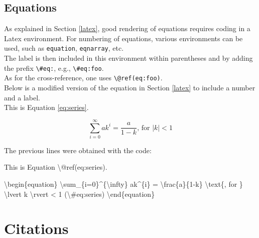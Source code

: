 \documentclass[]{book}
\newenvironment{Shaded}{}{}
\newcommand{\NormalTok}[1]{#1}
\theoremstyle{definition}
\theoremstyle{definition}
\theoremstyle{definition}
\theoremstyle{remark}
\begin{document}
\hypertarget{equations}{%
\subsection{Equations}\label{equations}}

As explained in Section \ref{latex}, good rendering of equations
requires coding in a Latex environment. For numbering of equations,
various environments can be used, such as \texttt{equation},
\texttt{eqnarray}, etc.\\
The label is then included in this environment within parentheses and by
adding the prefix \texttt{\textbackslash{}\#eq:}, e.g.,
\texttt{\textbackslash{}\#eq:foo}.\\
As for the cross-reference, one uses
\texttt{\textbackslash{}@ref(eq:foo)}.\\
Below is a modified version of the equation in Section \ref{latex} to
include a number and a label.\\
This is Equation \eqref{eq:series}.

\begin{equation} 
\sum_{i=0}^{\infty} ak^{i} = \frac{a}{1-k} \text{, for }  \lvert k \rvert < 1
  \label{eq:series}
\end{equation}

The previous lines were obtained with the code:

\begin{Shaded}
\begin{Highlighting}[]
\NormalTok{This is Equation \textbackslash{}@ref(eq:series).}

\NormalTok{\textbackslash{}begin\{equation\} }
\NormalTok{\textbackslash{}sum_\{i=0\}^\{\textbackslash{}infty\} ak^\{i\} = \textbackslash{}frac\{a\}\{1-k\} \textbackslash{}text\{, for \}  \textbackslash{}lvert k \textbackslash{}rvert < 1}
\NormalTok{  (\textbackslash{}#eq:series)}
\NormalTok{\textbackslash{}end\{equation\}}
\end{Highlighting}
\end{Shaded}

\hypertarget{citations}{%
\section{Citations}\label{citations}}
\end{document}

